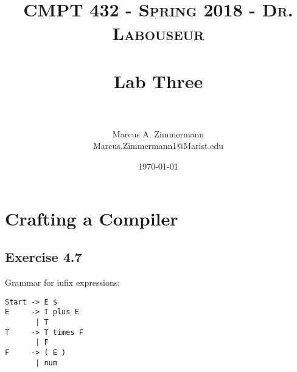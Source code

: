 \documentclass[letterpaper, 10pt,DIV=13]{scrartcl}
\title{	
   \normalfont \normalsize
   \textsc{CMPT 432 - Spring 2018 - Dr. Labouseur} \\[10pt] %
   \horrule{0.5pt} \\[0.25cm] 	%
   \huge Lab Three  \\     	    %
   \horrule{0.5pt} \\[0.25cm] 	%
}
\author{Marcus A. Zimmermann \\ \normalsize Marcus.Zimmermann1@Marist.edu}
\date{\normalsize\today} 	%
\numberwithin{equation}{section} %
\numberwithin{figure}{section} %
\numberwithin{table}{section} %
\begin{document}
\maketitle %

\section*{Crafting a Compiler}
\subsection*{Exercise 4.7}
Grammar for infix expressions:
\begin{lstlisting}
Start -> E $
E     -> T plus E
       | T
T     -> T times F
       | F
F     -> ( E )
       | num
\end{lstlisting}
\end{document}
